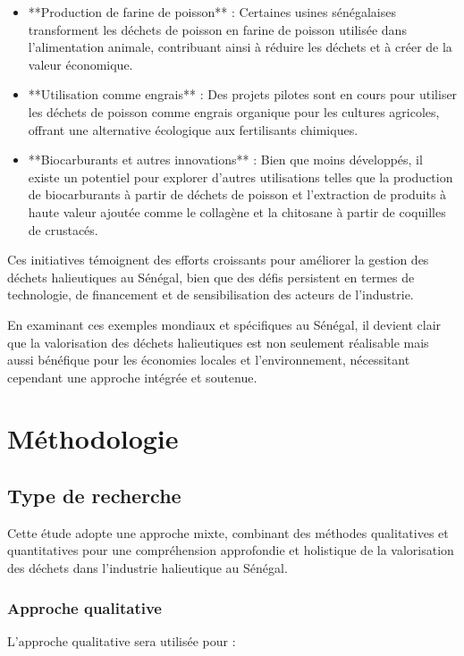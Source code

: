 \documentclass[12pt,a4paper]{report}
\begin{document}
\begin{itemize}
    \item **Production de farine de poisson** : Certaines usines sénégalaises transforment les déchets de poisson en farine de poisson utilisée dans l'alimentation animale, contribuant ainsi à réduire les déchets et à créer de la valeur économique.
    \item **Utilisation comme engrais** : Des projets pilotes sont en cours pour utiliser les déchets de poisson comme engrais organique pour les cultures agricoles, offrant une alternative écologique aux fertilisants chimiques.
    \item **Biocarburants et autres innovations** : Bien que moins développés, il existe un potentiel pour explorer d'autres utilisations telles que la production de biocarburants à partir de déchets de poisson et l'extraction de produits à haute valeur ajoutée comme le collagène et la chitosane à partir de coquilles de crustacés.
\end{itemize}

Ces initiatives témoignent des efforts croissants pour améliorer la gestion des déchets halieutiques au Sénégal, bien que des défis persistent en termes de technologie, de financement et de sensibilisation des acteurs de l'industrie.

En examinant ces exemples mondiaux et spécifiques au Sénégal, il devient clair que la valorisation des déchets halieutiques est non seulement réalisable mais aussi bénéfique pour les économies locales et l'environnement, nécessitant cependant une approche intégrée et soutenue.


\chapter{Méthodologie}
\section{Type de recherche}

Cette étude adopte une approche mixte, combinant des méthodes qualitatives et quantitatives pour une compréhension approfondie et holistique de la valorisation des déchets dans l'industrie halieutique au Sénégal.

\subsection{Approche qualitative}

L'approche qualitative sera utilisée pour :
\end{document}
